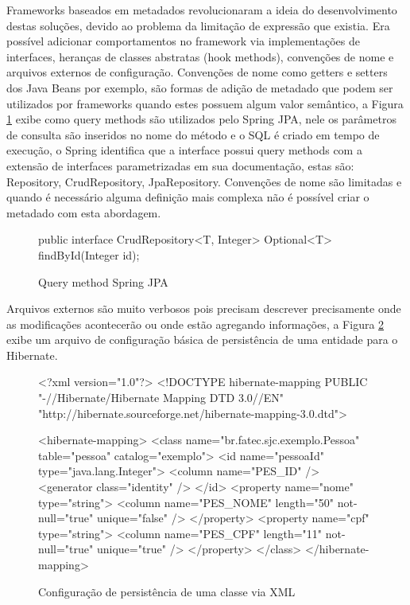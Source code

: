 \par Frameworks baseados em metadados revolucionaram a ideia do desenvolvimento destas soluções, devido ao problema da limitação de expressão que existia. Era possível adicionar comportamentos no framework via implementações de interfaces, heranças de classes abstratas (hook methods), convenções de nome e arquivos externos de configuração. Convenções de nome como getters e setters dos Java Beans por exemplo, são formas de adição de metadado que podem ser utilizados por frameworks quando estes possuem algum valor semântico, a Figura \ref{fig:spring-qyery-method} exibe como query methods são utilizados pelo Spring JPA, nele os parâmetros de consulta são inseridos no nome do método e o SQL é criado em tempo de execução, o Spring identifica que a interface possui query methods com a extensão de interfaces parametrizadas em sua documentação, estas são: Repository, CrudRepository, JpaRepository. Convenções de nome são limitadas e quando é necessário alguma definição mais complexa não é possível criar o metadado com esta abordagem. 

\begin{figure}[H]
    \centering
    \begin{java}
public interface CrudRepository<T, Integer> {
    Optional<T> findById(Integer id);
}
    \end{java}
    \caption{Query method Spring JPA}
    \label{fig:spring-qyery-method}
\end{figure}

Arquivos externos são muito verbosos pois precisam descrever precisamente onde as modificações acontecerão ou onde estão agregando informações, a Figura \ref{fig:arquivo-metadado} exibe um arquivo de configuração básica de persistência de uma entidade para o Hibernate.

\begin{figure}[H]
    \centering
    \begin{xml}
<?xml version="1.0"?>
<!DOCTYPE hibernate-mapping PUBLIC "-//Hibernate/Hibernate Mapping DTD 3.0//EN"
"http://hibernate.sourceforge.net/hibernate-mapping-3.0.dtd">

<hibernate-mapping>
    <class name="br.fatec.sjc.exemplo.Pessoa" table="pessoa" catalog="exemplo">
        <id name="pessoaId" type="java.lang.Integer">
            <column name="PES_ID" />
            <generator class="identity" />
        </id>
        <property name="nome" type="string">
            <column name="PES_NOME" length="50" not-null="true" unique="false" />
        </property>
        <property name="cpf" type="string">
            <column name="PES_CPF" length="11" not-null="true" unique="true" />
        </property>
    </class>
</hibernate-mapping>
    \end{xml}
    \caption{Configuração de persistência de uma classe via XML}
    \label{fig:arquivo-metadado}
\end{figure}

